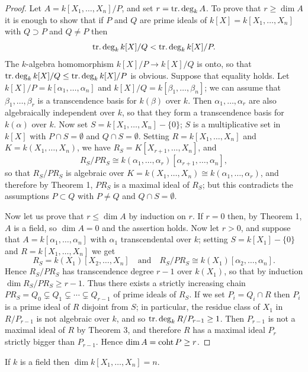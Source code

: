 \begin{proof}
Let $A = k[X_1, \ldots, X_n]/P$, and set $r = \operatorname{tr.deg}_k A$. To prove that
$r \ge \dim A$ it is enough to show that if $P$ and $Q$ are prime ideals of
$k[X] = k[X_1, \ldots, X_n]$ with $Q \supset P$ and $Q \neq P$ then
\[
  \operatorname{tr.deg}_k k[X]/Q < \operatorname{tr.deg}_k k[X]/P.
\]
The $k$-algebra homomorphism $k[X]/P \to k[X]/Q$ is onto, so that $\operatorname{tr.deg}_k
k[X]/Q \le \operatorname{tr.deg}_k k[X]/P$ is obvious. Suppose that equality holds. Let
$k[X]/P = k[\alpha_1, \ldots, \alpha_n]$ and $k[X]/Q = k[\beta_1, \ldots, \beta_n]$; we can assume that
$\beta_1, \ldots, \beta_r$ is a transcendence basis for $k(\beta)$ over $k$. Then $\alpha_1, \ldots, \alpha_r$ are also
algebraically independent over $k$, so that they form a transcendence basis
for $k(\alpha)$ over $k$. Now set $S = k[X_1, \ldots, X_n] - \{0\}$; $S$ is a multiplicative set in
$k[X]$ with $P \cap S = \emptyset$ and $Q \cap S = \emptyset$. Setting $R = k[X_1, \ldots, X_n]$ and
$K = k(X_1, \ldots, X_n)$, we have $R_S = K[X_{r+1}, \ldots, X_n]$, and
\[
  R_S/PR_S \cong k(\alpha_1, \ldots, \alpha_r)[\alpha_{r+1}, \ldots, \alpha_n],
\]
so that $R_S/PR_S$ is algebraic over $K = k(X_1, \ldots, X_n) \cong k(\alpha_1, \ldots, \alpha_r)$, and
therefore by Theorem 1, $PR_S$ is a maximal ideal of $R_S$; but this contradicts
the assumptions $P \subset Q$ with $P \neq Q$ and $Q \cap S = \emptyset$.

Now let us prove that $r \le \dim A$ by induction on $r$. If $r = 0$ then, by
Theorem 1, $A$ is a field, so $\dim A = 0$ and the assertion holds. Now let $r > 0$,
and suppose that $A = k[\alpha_1, \ldots, \alpha_n]$ with $\alpha_1$ transcendental over $k$; setting
$S = k[X_1] - \{0\}$ and $R = k[X_1, \ldots, X_n]$ we get
\[
  R_S = k(X_1)[X_2, \ldots, X_n] \quad \text{and} \quad R_S/PR_S \cong k(X_1)[\alpha_2, \ldots, \alpha_n].
\]
Hence $R_S/PR_S$ has transcendence degree $r - 1$ over $k(X_1)$, so that by
induction $\dim R_S/PR_S \ge r - 1$. Thus there exists a strictly increasing chain
$PR_S = Q_0 \subsetneq Q_1 \subsetneq \cdots \subsetneq Q_{r-1}$ of prime ideals of $R_S$. If we set $P_i = Q_i \cap R$ then
$P_i$ is a prime ideal of $R$ disjoint from $S$; in particular, the residue class of
$X_1$ in $R/P_{r-1}$ is not algebraic over $k$, and so $\operatorname{tr.deg}_k R/P_{r-1} \ge 1$. Then
$P_{r-1}$ is not a maximal ideal of $R$ by Theorem 3, and therefore $R$ has a
maximal ideal $P_r$ strictly bigger than $P_{r-1}$. Hence $\dim A = \operatorname{coht} P \ge r$.
\end{proof}

\begin{corollary*}
If $k$ is a field then $\dim k[X_1, \ldots, X_n] = n$.
\end{corollary*}

